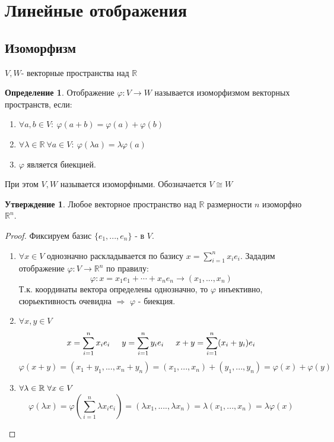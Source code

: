\documentclass[a4paper, 12pt]{article}
\newcommand{\R}{\mathbb R}
\renewcommand{\phi}{\varphi}
\newcommand\tab[1][.5cm]{\hspace*{#1}}
\theoremstyle{definition}
\newtheorem*{definition}{Определение}
\newtheorem*{subtheorem}{Утверждение}
\begin{document}
  \section{Линейные отображения}
  \subsection{Изоморфизм}
  
  $V, W$- векторные пространства над $\R$ 
  \begin{definition}
    Отображение $\phi: V \to W$ называется изоморфизмом векторных пространств, если:
    \begin{enumerate}
      \item $\forall a, b \in V: \ \phi(a+b) = \phi(a) + \phi(b)$
      \item $\forall \lambda \in \R \ \forall a \in V: \ \phi(\lambda a) = \lambda \phi(a)$
      \item $\phi$ является биекцией. 
    \end{enumerate}
    При этом $V, W$ называется изоморфными. Обозначается $V \cong W$ 
  \end{definition} 
  \begin{subtheorem}
    Любое векторное  пространство над $\R$ размерности $n$ изоморфно $\R^n$. 
  \end{subtheorem} 
  \begin{proof}
    Фиксируем базис $\{e_1,...,e_n\}$ - в $V$.
    \begin{enumerate}
      \item $\forall x \in V$ однозначно раскладывается по базису $x = \sum \limits_{i=1}^{n} x_ie_i$. 
    Зададим отображение  $\phi: V \to \R^n$ по правилу:
    $$\phi: x = x_1e_1 + \cdots + x_ne_n \to (x_1,...,x_n)$$
    Т.к. координаты вектора определены однозначно, то $\phi$ инъективно, сюрьективность очевидна $\Longrightarrow $ $\phi$ - биекция.
    \item $\forall x,y \in V$
    $$x = \sum \limits_{i=1}^{n} x_ie_i \tab[0.5cm] y = \sum \limits_{i=1}^{n} y_ie_i \tab[0.5cm]
    x + y = \sum \limits_{i=1}^{n} (x_i + y_i)e_i$$ 
    $$\phi(x+y) = (x_1 + y_1,...,x_n+y_n) = (x_1,...,x_n) + (y_1,...,y_n) = \phi(x) + \phi(y)$$ 
    \item $\forall \lambda \in \R \tab[0.1cm] \forall x \in V$
    $$\phi(\lambda x) = \phi(\sum \limits_{i=1}^{n} \lambda x_ie_i) = (\lambda x_1,....,\lambda x_n) = \lambda (x_1,...,x_n) = \lambda \phi(x)$$  
    \end{enumerate}
  \end{proof} 
\end{document}

